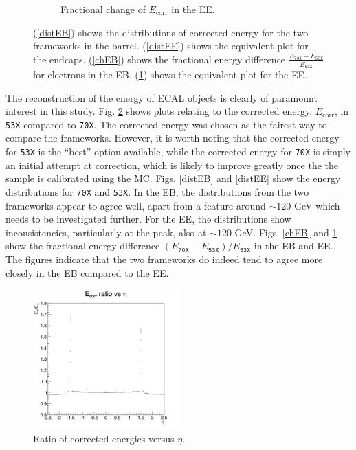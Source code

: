 \documentclass[10pt]{article}
\begin{document}
\begin{figure}[h!]
\begin{subfigure}[b]{0.4\textwidth}
                \caption{Fractional change of $E_{\text{corr}}$ in the EE.}
                \label{chEE}
        \end{subfigure}
        \caption{ (\ref{distEB}) shows the distributions of corrected energy for the two frameworks in the barrel. (\ref{distEE}) shows the equivalent plot for the endcaps. (\ref{chEB}) shows the fractional energy difference $\frac{E_\texttt{70X} -E_\texttt{53X}}{E_\texttt{53X}}$ for electrons in the EB. (\ref{chEE}) shows the equivalent plot for the EE.}
        \label{energyValidation}
\end{figure}

The reconstruction of the energy of ECAL objects is clearly of paramount interest in this study. Fig. \ref{energyValidation} shows plots relating to the corrected energy, $E_{\text{corr}}$, in \texttt{53X} compared to \texttt{70X}. The corrected energy was chosen as the fairest way to compare the frameworks. However, it is worth noting that the corrected energy for \texttt{53X} is the ``best'' option available, while the corrected energy for \texttt{70X} is simply an initial attempt at correction, which is likely to improve greatly once the the sample is calibrated using the MC. Figs. \ref{distEB} and \ref{distEE} show the energy distributions for \texttt{70X} and \texttt{53X}. In the EB, the distributions from the two frameworks appear to agree well, apart from a feature around $\sim 120$ GeV which needs to be investigated further. For the EE, the distributions show inconsistencies, particularly at the peak, also at $\sim 120$ GeV. Figs. \ref{chEB} and \ref{chEE} show the fractional energy difference $(E_\texttt{70X}-E_\texttt{53X})/E_\texttt{53X}$ in the EB and EE. The figures indicate that the two frameworks do indeed tend to agree more closely in the EB compared to the EE.

\begin{figure}[h!]
        \centering
                \includegraphics[width=0.5\textwidth]{fullRunPlots/corrE_profile}
                \caption{Ratio of corrected energies versus $\eta$.}
                \label{E_profile}
\end{figure}
\end{document}
